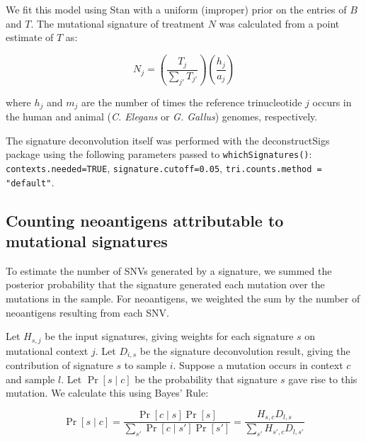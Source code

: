 We fit this model using Stan\cite{Gelman_2015} with a uniform (improper) prior on the entries of $B$ and $T$. The mutational signature of treatment $N$ was calculated from a point estimate of $T$ as:

\[
N_j = \left ( \frac{T_j}{\sum_{j'}{T_{j'}}} \right ) \left ( \frac{h_j}{a_j} \right )
\]

where $h_j$ and $m_j$ are the number of times the reference trinucleotide $j$ occurs in the human and animal (\textit{C. Elegans} or \textit{G. Gallus}) genomes, respectively.

The signature deconvolution itself was performed with the deconstructSigs\cite{Rosenthal_2016} package using the following parameters passed to \texttt{whichSignatures()}: \texttt{contexts.needed=TRUE}, \texttt{signature.cutoff=0.05}, \texttt{tri.counts.method = "default"}.

\subsection*{Counting neoantigens attributable to mutational signatures}
To estimate the number of SNVs generated by a signature, we summed the posterior probability that the signature generated each mutation over the mutations in the sample. For neoantigens, we weighted the sum by the number of neoantigens resulting from each SNV.

Let $H_{s,j}$ be the input signatures, giving weights for each signature $s$ on mutational context $j$. Let $D_{i,s}$ be the signature deconvolution result, giving the contribution of signature $s$ to sample $i$. Suppose a mutation occurs in context $c$ and sample $l$. Let $\Pr[s \mid c]$ be the probability that signature $s$ gave rise to this mutation. We calculate this using Bayes' Rule:

\[
\Pr[s \mid c] = \frac{\Pr[c \mid s] \Pr[s]}{\sum_{s'}{\Pr[c \mid s']\Pr[s']}} = \frac{H_{s,c} D_{l,s}}{\sum_{s'}{H_{s',c} D_{l,s'}}}
\]

